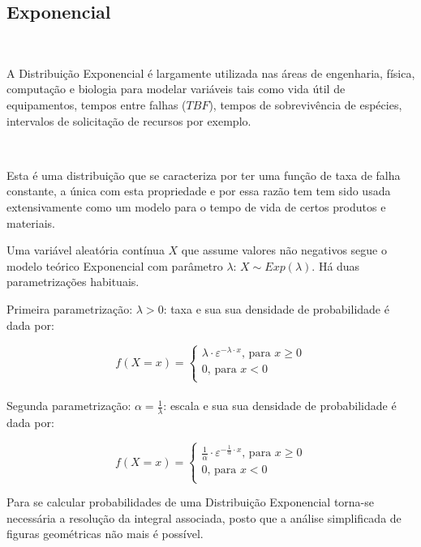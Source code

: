 \documentclass[
]{book}
\begin{document}
\hfill\break

\hypertarget{exponencial}{%
\subsection{Exponencial}\label{exponencial}}

~

A Distribuição Exponencial é largamente utilizada nas áreas de engenharia, física, computação e biologia para modelar variáveis tais como vida útil de equipamentos, tempos entre falhas (\(TBF\)), tempos de sobrevivência de espécies, intervalos de solicitação de recursos por exemplo.

~

Esta é uma distribuição que se caracteriza por ter uma função de taxa de falha constante, a única com esta propriedade e por essa razão tem tem sido usada extensivamente como um modelo para o tempo de vida de certos produtos e materiais.

\hfill\break

Uma variável aleatória contínua \(X\) que assume valores não negativos segue o modelo teórico Exponencial com parâmetro \(\lambda\): \(X \sim Exp (\lambda)\). Há duas parametrizações habituais.

\hfill\break

Primeira parametrização: \(\lambda>0\): taxa e sua sua densidade de probabilidade é dada por:

\hfill\break

\[
f(X=x)=
\begin{cases}
    \lambda \cdot \varepsilon ^{-\lambda \cdot x} \text{, para } x \ge 0 \\
    0 \text{, para } x < 0\\
\end{cases}
\]\\

Segunda parametrização: \(\alpha=\frac{1}{\lambda}\): escala e sua sua densidade de probabilidade é dada por:

\hfill\break

\[
f(X=x)=
\begin{cases}
    \frac{1}{\alpha} \cdot \varepsilon ^{-\frac{1}{\alpha} \cdot x} \text{, para } x \ge 0 \\
    0 \text{, para } x < 0\\
\end{cases}
\]

\hfill\break

Para se calcular probabilidades de uma Distribuição Exponencial torna-se necessária a resolução da integral associada, posto que a análise simplificada de figuras geométricas não mais é possível.
\end{document}
